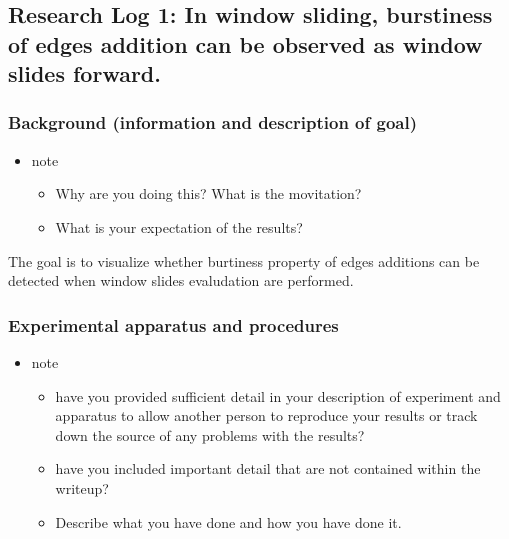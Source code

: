 \documentclass[11pt]{article}
\begin{document}
\subsection{Research Log 1: In window sliding, burstiness of edges addition can be observed as window slides forward.}
\label{sec:orga77b149}
\subsubsection{Background (information and description of goal)}
\label{sec:orgdeafeae}
\begin{itemize}
\item note
\begin{itemize}
\item Why are you doing this? What is the movitation?
\item What is your expectation of the results?
\end{itemize}
\end{itemize}

The goal is to visualize whether burtiness property of edges additions can be detected when window slides evaludation are performed.

\subsubsection{Experimental apparatus and procedures}
\label{sec:org4d6a933}
\begin{itemize}
\item note
\begin{itemize}
\item have you provided sufficient detail in your description of experiment and apparatus to allow another person to reproduce your results or track down the source of any problems with the results?
\item have you included important detail that are not contained within the writeup?
\item Describe what you have done and how you have done it.
\end{itemize}
\end{itemize}
\end{document}
